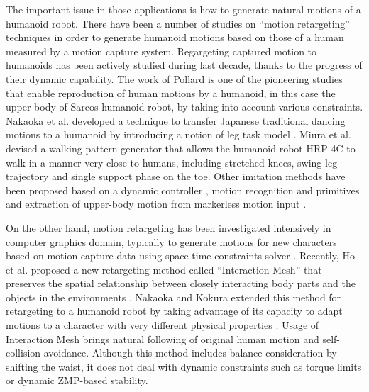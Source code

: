 \documentclass[letterpaper, 10 pt, conference]{ieeeconf}  %
\begin{document}
The important issue in those applications is how to generate natural
motions of a humanoid robot. 
There have been a number of studies on ``motion retargeting''
techniques in order to
generate humanoid motions based on those of a human measured by a
motion capture system.
Regargeting captured motion to humanoids has been
actively studied during last decade, thanks to the progress of their
dynamic capability. The work of Pollard \cite{Pollard02ICRA} is one of
the pioneering studies that enable reproduction of human motions
by a humanoid, in this case the upper body of Sarcos humanoid robot,
by taking into account various constraints. 
Nakaoka et al. developed a technique to  transfer
Japanese traditional dancing motions  to a humanoid by introducing a
notion of leg task model \cite{nakaoka_icra2004,nakaoka_2007}.
Miura et al. \cite{Miura11IROS} devised a walking pattern generator
that allows the humanoid robot HRP-4C to walk in a manner very close
to humans, including stretched knees, swing-leg trajectory and single
support phase on the toe.
Other imitation methods have been proposed based on a dynamic
controller  \cite{Yamane11humanoids,Ramos11humanoids}, 
motion recognition and primitives \cite{Ott08humanoids} and
extraction of upper-body motion from markerless motion input
\cite{Dariush08IROS,Do08humanoids}. 



% 


On the other hand, motion retargeting has been investigated
intensively in computer graphics domain, typically to generate motions
for new characters based on motion capture data using space-time
constraints solver \cite{Gleicher98}.  
Recently, Ho et al. proposed a new retargeting method called
``Interaction Mesh'' 
that preserves the spatial relationship between closely interacting body
parts and the objects in the environments \cite{Komura10}.
Nakaoka and Kokura extended this method for retargeting to a humanoid
robot by taking advantage of its capacity to adapt motions
to a character with very different physical properties
\cite{Nakaoka12Humanoids}. Usage of Interaction Mesh brings natural
following of original human motion and self-collision avoidance.
Although this method includes
balance consideration by shifting the waist,  it does not deal with 
dynamic constraints such as torque limits or dynamic ZMP-based stability.
\end{document}
